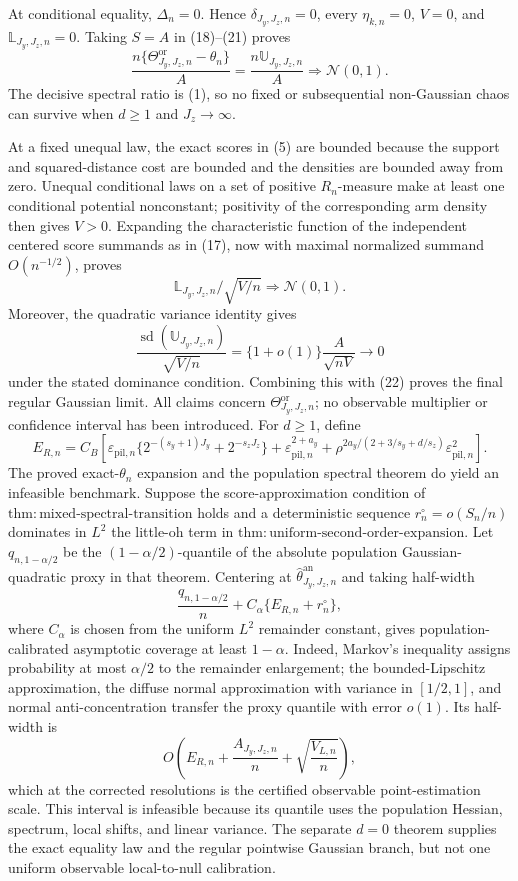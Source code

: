 At conditional equality, \(\Delta_n=0\). Hence \(\delta_{J_y,J_z,n}=0\), every \(\eta_{k,n}=0\), \(V=0\), and \(\mathbb L_{J_y,J_z,n}=0\). Taking \(S=A\) in (18)--(21) proves
\[
\frac{n\{\Theta^{\mathrm{or}}_{J_y,J_z,n}-\theta_n\}}{A}
=\frac{n\mathbb U_{J_y,J_z,n}}{A}\Rightarrow\mathcal N(0,1).
\]
The decisive spectral ratio is (1), so no fixed or subsequential non-Gaussian chaos can survive when \(d\ge1\) and \(J_z\to\infty\).

At a fixed unequal law, the exact scores in (5) are bounded because the support and squared-distance cost are bounded and the densities are bounded away from zero. Unequal conditional laws on a set of positive \(R_n\)-measure make at least one conditional potential nonconstant; positivity of the corresponding arm density then gives \(V>0\). Expanding the characteristic function of the independent centered score summands as in (17), now with maximal normalized summand \(O(n^{-1/2})\), proves
\[
\mathbb L_{J_y,J_z,n}/\sqrt{V/n}\Rightarrow\mathcal N(0,1).
\]
Moreover, the quadratic variance identity gives
\[
\frac{\operatorname{sd}(\mathbb U_{J_y,J_z,n})}{\sqrt{V/n}}
=\{1+o(1)\}\frac{A}{\sqrt{nV}}\longrightarrow0
\]
under the stated dominance condition. Combining this with (22) proves the final regular Gaussian limit. All claims concern \(\Theta^{\mathrm{or}}_{J_y,J_z,n}\); no observable multiplier or confidence interval has been introduced.
For \(d\ge1\), define
\[
E_{R,n}=C_B\left[
\varepsilon_{\mathrm{pil},n}\{2^{-(s_y+1)J_y}+2^{-s_zJ_z}\}
+\varepsilon_{\mathrm{pil},n}^{2+a_y}
+\rho^{2a_y/(2+3/s_y+d/s_z)}\varepsilon_{\mathrm{pil},n}^2
\right].
\]
The proved exact-\(\theta_n\) expansion and the population spectral theorem do yield an infeasible benchmark. Suppose the score-approximation condition of \(\mathrm{thm{:}mixed\text{-}spectral\text{-}transition}\) holds and a deterministic sequence \(r_n^{\circ}=o(S_n/n)\) dominates in \(L^2\) the little-oh term in \(\mathrm{thm{:}uniform\text{-}second\text{-}order\text{-}expansion}\). Let \(q_{n,1-\alpha/2}\) be the \((1-\alpha/2)\)-quantile of the absolute population Gaussian-quadratic proxy in that theorem. Centering at \(\widehat\theta^{\mathrm{an}}_{J_y,J_z,n}\) and taking half-width
\[
\frac{q_{n,1-\alpha/2}}{n}+C_\alpha\{E_{R,n}+r_n^{\circ}\},
\]
where \(C_\alpha\) is chosen from the uniform \(L^2\) remainder constant, gives population-calibrated asymptotic coverage at least \(1-\alpha\). Indeed, Markov's inequality assigns probability at most \(\alpha/2\) to the remainder enlargement; the bounded-Lipschitz approximation, the diffuse normal approximation with variance in \([1/2,1]\), and normal anti-concentration transfer the proxy quantile with error \(o(1)\). Its half-width is
\[
O\!\left(E_{R,n}+\frac{A_{J_y,J_z,n}}n+\sqrt{\frac{V_{L,n}}n}\right),
\]
which at the corrected resolutions is the certified observable point-estimation scale. This interval is infeasible because its quantile uses the population Hessian, spectrum, local shifts, and linear variance. The separate \(d=0\) theorem supplies the exact equality law and the regular pointwise Gaussian branch, but not one uniform observable local-to-null calibration.
